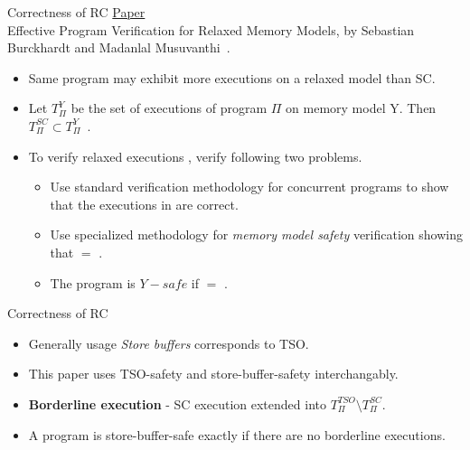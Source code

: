 \documentclass[9pt]{beamer}
\begin{document}
\begin{frame}{Correctness of RC}
\underline{Paper}\\
Effective Program Verification for Relaxed Memory Models, by Sebastian Burckhardt and
Madanlal Musuvanthi~\cite{Burckhardt2008}.
\begin{itemize}
\item Same program may exhibit more executions on
      a relaxed model than SC.
\item Let $T_{\Pi}^Y$ be the set of executions of program $\Pi$ on memory model Y.
        Then $T_{\Pi}^{SC} \subset T_{\Pi}^Y$~.
\item To verify relaxed executions \rlxset{}, verify following two problems.
  \begin{itemize}
  \item Use standard verification methodology for concurrent programs to show that
        the executions in \scset{} are correct.
  \item Use specialized methodology for {\em memory model safety} verification
        showing that \rlxset{} $=$ \scset{}.
  \item The program is $Y-safe$  if \rlxset{} $=$ \scset{}.
  \end{itemize}
\end{itemize}
\end{frame}

\begin{frame}{Correctness of RC~}
\begin{itemize}
\item Generally usage {\em Store buffers} corresponds to TSO.
\item This paper uses TSO-safety and store-buffer-safety interchangably.
\item \textbf{Borderline execution} - SC execution extended into $T_{\Pi}^{TSO} \setminus  T_{\Pi}^{SC}$.
\item A program is store-buffer-safe exactly if there are no borderline executions.
\end{itemize}

\end{frame}
\end{document}
